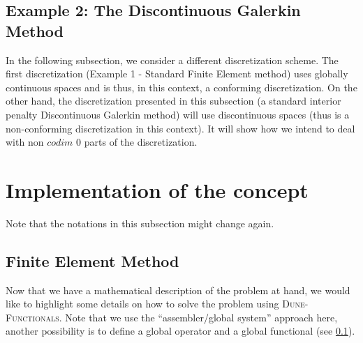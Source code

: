 \documentclass[a4paper,11pt]{article}
\numberwithin{equation}{section}
\newcommand{\dunefunctionals}{\textsc{Dune-Functionals}\xspace}
\begin{document}
\subsection{Example 2: The Discontinuous Galerkin Method}

In the following subsection, we consider a different discretization scheme. The first discretization (Example 1 - Standard Finite
Element method) uses globally continuous spaces and is thus, in this context, a conforming discretization. On the other hand, the
discretization presented in this subsection (a standard interior penalty Discontinuous Galerkin method) will use discontinuous spaces (thus
is a non-conforming discretization in this context). It will show how we intend to deal with non $codim$ 0 parts
of the discretization.




\section{Implementation of the concept}
\label{section::implementation}

Note that the notations in this subsection might change again.


\subsection{Finite Element Method}
\label{subsection::discretization::finite_element_method}
	

Now that we have a mathematical description of the problem at hand, we would like to highlight some details on how to
solve the problem using \dunefunctionals. Note that we use the ``assembler/global system'' approach here, another
possibility is to define a global operator and a global functional (see \ref{}).
\end{document}
